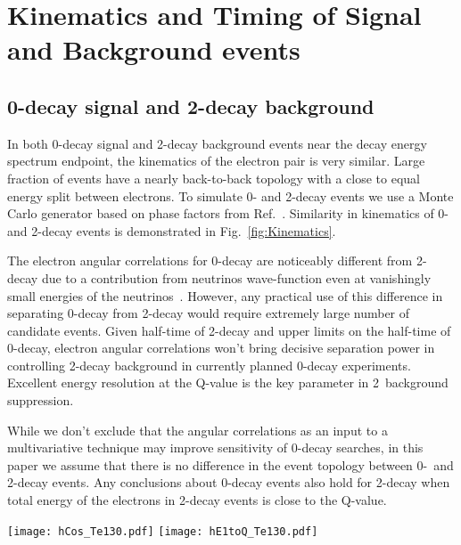 \section{Kinematics and Timing of Signal and Background events}
\label{sec:kinematics_and_timing}

\subsection{0\nbb-decay signal and 2\nbb-decay background}

In both 0\nbb-decay signal and 2\nbb-decay background events near the decay energy spectrum endpoint, the kinematics of the
electron pair is very similar. Large fraction of events have a nearly back-to-back topology with a close to 
equal energy split between electrons. To simulate 0\nbb- and 2\nbb-decay events we use a Monte Carlo generator based on phase 
factors from Ref.~\cite{Jenni}. Similarity in kinematics of 0\nbb- and 2\nbb-decay events is demonstrated in Fig.~\ref{fig:Kinematics}.

The electron angular correlations for 0\nbb-decay are noticeably different from 2\nbb-decay due to a contribution from
neutrinos wave-function even at vanishingly small energies of the neutrinos~\cite{Jenni}. However, any practical use of this difference 
in separating 0\nbb-decay from 2\nbb-decay would require extremely large number of candidate events. Given half-time of 2\nbb-decay 
and upper limits on the half-time of 0\nbb-decay, electron angular correlations won't bring decisive separation power in controlling 
2\nbb-decay background in currently planned 0\nbb-decay experiments. Excellent energy resolution at the Q-value is the key parameter
in 2\nbb~background suppression.

While we don't exclude that the angular correlations as an input to a multivariative technique may improve sensitivity of 0\nbb-decay 
searches, in this paper we assume that there is no difference in the event topology between 0\nbb-~and 2\nbb-decay events. Any conclusions 
about 0\nbb-decay events also hold for 2\nbb-decay when total energy of the electrons in 2\nbb-decay events is close to the Q-value.


\begin{figure*}[ht]
  \centering
  \texttt{[image: hCos\_Te130.pdf]}
  \texttt{[image: hE1toQ\_Te130.pdf]}
  \caption{Comparison between kinematics of 0{\nbb} (\emph{dashed red
      lines}) and 2{\nbb} decays (\emph{solid black lines}) for events
    with the total kinetic energy of the electrons above 90\% of the
    Q-value. \emph{Left:} Cosine of the angle between two
    electrons. \emph{Right:} Fraction of energy carried by one of the
    two electrons. Vertical bars at each bin of the histograms indicate
    statistical uncertainty for that bin.}
  \label{fig:Kinematics}
\end{figure*}


